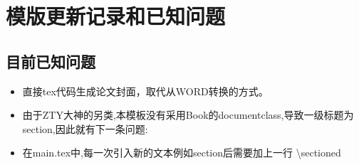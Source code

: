 
\section{模版更新记录和已知问题}
\subsection{目前已知问题}
\begin{itemize}
\item 直接tex代码生成论文封面，取代从WORD转换的方式。
\item 由于ZTY大神的另类,本模板没有采用Book的documentclass,导致一级标题为section,因此就有下一条问题:
\item 在main.tex中,每一次引入新的文本例如section后需要加上一行 \textbackslash sectioned

\end{itemize}